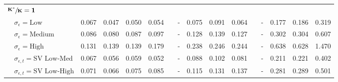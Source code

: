 \begin{table}[!tbp]
\begin{center}
\begin{tabular}{lllllcllllcllll}
\hline
{\bfseries $\mathbf{\sfrac{K^*}{K}=1}$}&&&&&&&&&&&&&&\tabularnewline
~~$\sigma_{\epsilon} =\text{Low}$& 0.067& 0.047& 0.050& 0.054&&-& 0.075& 0.091& 0.064&&-& 0.177& 0.186& 0.319\tabularnewline
~~$\sigma_{\epsilon} =\text{Medium}$& 0.086& 0.080& 0.087& 0.097&&-& 0.128& 0.139& 0.127&&-& 0.302& 0.304& 0.607\tabularnewline
~~$\sigma_{\epsilon} =\text{High}$& 0.131& 0.139& 0.139& 0.179&&-& 0.238& 0.246& 0.244&&-& 0.638& 0.628& 1.470\tabularnewline
~~$\sigma_{\epsilon,t} = \text{SV Low-Med}$& 0.067& 0.056& 0.059& 0.052&&-& 0.088& 0.102& 0.081&&-& 0.211& 0.221& 0.402\tabularnewline
~~$\sigma_{\epsilon,t}  = \text{SV Low-High}$& 0.071& 0.066& 0.075& 0.085&&-& 0.115& 0.131& 0.137&&-& 0.281& 0.289& 0.501\tabularnewline
\hline
\end{tabular}\end{center}
\end{table}
